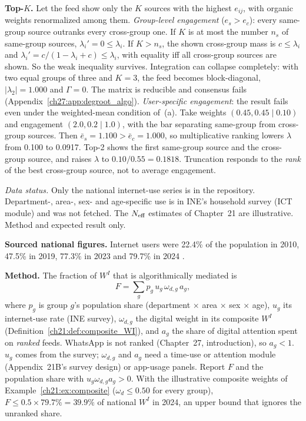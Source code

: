 \documentclass[../solutions_manual.tex]{subfiles}
\begin{document}
 \textbf{Top-$K$.} Let the feed show only the $K$ sources with the highest $e_{ij}$, with organic weights renormalized among them. \emph{Group-level engagement} ($e_s > e_c$): every same-group source outranks every cross-group one. If $K$ is at most the number $n_s$ of same-group sources, $\lambda_i' = 0 \le \lambda_i$. If $K > n_s$, the shown cross-group mass is $c \le \lambda_i$ and $\lambda_i' = c/(1-\lambda_i+c) \le \lambda_i$, with equality iff all cross-group sources are shown. So the weak inequality survives. Integration can collapse completely: with two equal groups of three and $K = 3$, the feed becomes block-diagonal, $|\lambda_2| = 1.000$ and $\Gamma = 0$. The matrix is reducible and consensus fails (Appendix~\ref{ch27:app:degroot_algo}). \emph{User-specific engagement}: the result fails even under the weighted-mean condition of~(a). Take weights $(0.45, 0.45 \mid 0.10)$ and engagement $(2.0, 0.2 \mid 1.0)$, with the bar separating same-group from cross-group sources. Then $\bar e_s = 1.100 > \bar e_c = 1.000$, so multiplicative ranking lowers $\lambda$ from 0.100 to 0.0917. Top-2 shows the first same-group source and the cross-group source, and raises $\lambda$ to $0.10/0.55 = 0.1818$. Truncation responds to the \emph{rank} of the best cross-group source, not to average engagement.


\emph{Data status.} Only the national internet-use series is in the repository. Department-, area-, sex- and age-specific use is in INE's household survey (ICT module) and was not fetched. The $N_{\text{eff}}$ estimates of Chapter~21 are illustrative. Method and expected result only.

 \textbf{Sourced national figures.} Internet users were 22.4\% of the population in 2010, 47.5\% in 2019, 77.3\% in 2023 and 79.7\% in 2024 \citep{worldbank2026wdi}.

 \textbf{Method.} The fraction of $W^I$ that is algorithmically mediated is
\[
F = \sum_g p_g\,u_g\,\omega_{d,g}\,a_g,
\]
where $p_g$ is group $g$'s population share (department $\times$ area $\times$ sex $\times$ age), $u_g$ its internet-use rate (INE survey), $\omega_{d,g}$ the digital weight in its composite $W^I$ (Definition~\ref{ch21:def:composite_WI}), and $a_g$ the share of digital attention spent on \emph{ranked} feeds. WhatsApp is not ranked (Chapter~27, introduction), so $a_g < 1$. $u_g$ comes from the survey; $\omega_{d,g}$ and $a_g$ need a time-use or attention module (Appendix~21B's survey design) or app-usage panels. Report $F$ and the population share with $u_g\omega_{d,g}a_g > 0$. With the illustrative composite weights of Example~\ref{ch21:ex:composite} ($\omega_d \le 0.50$ for every group), $F \le 0.5 \times 79.7\% = 39.9\%$ of national $W^I$ in 2024, an upper bound that ignores the unranked share.
\end{document}
